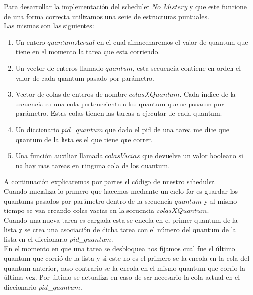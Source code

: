 Para desarrollar la implementación del scheduler $No$ $Mistery$ y que este funcione de una forma correcta
utilizamos una serie de estructuras puntuales. \\
Las mismas son las siguientes:\\
\begin{enumerate}
\item Un entero $quantumActual$ en el cual almacenaremos el valor de quantum que tiene en el momento la tarea que esta corriendo.
\item Un vector de enteros llamado $quantum$, esta secuencia contiene en orden el valor de cada quantum pasado por par\'{a}metro.
\item Vector de colas de enteros de nombre $colasXQuantum$. Cada \'{i}ndice de la secuencia es una cola perteneciente a los quantum 
que se pasaron por par\'{a}metro. Estas colas tienen las tareas a ejecutar de cada quantum.
\item Un diccionario $pid$\_$quantum$ que dado el pid de una tarea me dice que quantum de la lista es el que tiene que correr.
\item Una funci\'{o}n auxiliar llamada $colasVacias$ que devuelve un valor booleano si no hay mas tareas en ninguna cola de los 
quantum.
\end{enumerate}

A continuación explicaremos por partes el c\'{o}digo de nuestro scheduler.\\

Cuando inicializa lo primero que hacemos mediante un ciclo for es guardar los quantums pasados por par\'{a}metro dentro de la 
secuencia $quantum$ y al mismo tiempo se van creando colas vacias en la secuencia $colasXQuantum$.\\

Cuando una nueva tarea es cargada esta se encola en el primer quantum de la lista y se crea una asociaci\'{o}n de dicha tarea 
con el número del quantum de la lista en el diccionario $pid$\_$quantum$.\\

En el momento en que una tarea se desbloquea nos fijamos cual fue el \'{u}ltimo quantum que corrió de la lista y si este no es 
el primero se la encola en la cola del quantum anterior, caso contrario se la encola en el mismo quantum que corrio la \'{u}ltima vez.
Por \'{u}ltimo se actualiza en caso de ser necesario la cola actual en el diccionario $pid$\_$quantum$.\\

